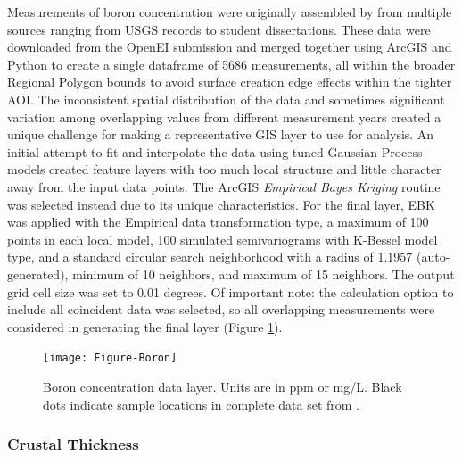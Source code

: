 Measurements of boron concentration were originally assembled by \citet{bielicki_hydrogeolgic_2015} from multiple sources ranging from USGS records to student dissertations. These data were downloaded from the OpenEI submission \citep{kelley_geothermal_2015} and merged together using ArcGIS and Python to create a single dataframe of 5686 measurements, all within the broader Regional Polygon bounds to avoid surface creation edge effects within the tighter AOI. The inconsistent spatial distribution of the data and sometimes significant variation among overlapping values from different measurement years created a unique challenge for making a representative GIS layer to use for analysis. An initial attempt to fit and interpolate the data using tuned Gaussian Process models created feature layers with too much local structure and little character away from the input data points. The ArcGIS \textit{Empirical Bayes Kriging} routine was selected instead due to its unique characteristics. For the final layer, EBK was applied with the Empirical data transformation type, a maximum of 100 points in each local model, 100 simulated semivariograms with K-Bessel model type, and a standard circular search neighborhood with a radius of 1.1957 (auto-generated), minimum of 10 neighbors, and maximum of 15 neighbors. The output grid cell size was set to 0.01 degrees. Of important note: the calculation option to include all coincident data was selected, so all overlapping measurements were considered in generating the final layer (Figure \ref{fig:feat_boron}).

\begin{figure}[!htp]
\centering
\texttt{[image: Figure-Boron]}
\caption[Boron concentration data layer]{Boron concentration data layer. Units are in ppm or mg/L. Black dots indicate sample locations in complete data set from \protect\citep{bielicki_hydrogeolgic_2015}.}
\label{fig:feat_boron}
\end{figure}

\subsubsection{Crustal Thickness}

